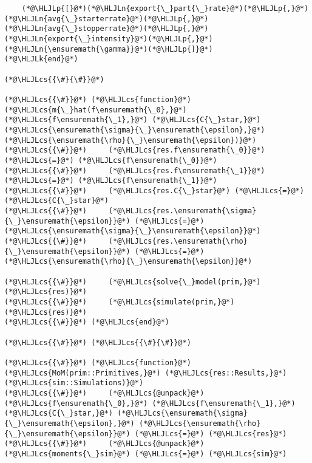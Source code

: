 \documentclass[12pt,a4paper]{article}
\newcommand{\HLJLk}[1]{\textcolor[RGB]{148,91,176}{\textbf{#1}}}
\newcommand{\HLJLn}[1]{#1}
\newcommand{\HLJLp}[1]{#1}
\newcommand{\HLJLcs}[1]{\textcolor[RGB]{153,153,119}{\textit{#1}}}
\begin{document}
\begin{lstlisting}
    (*@\HLJLp{[}@*)(*@\HLJLn{export{\_}part{\_}rate}@*)(*@\HLJLp{,}@*) (*@\HLJLn{avg{\_}starterrate}@*)(*@\HLJLp{,}@*) (*@\HLJLn{avg{\_}stopperrate}@*)(*@\HLJLp{,}@*) (*@\HLJLn{export{\_}intensity}@*)(*@\HLJLp{,}@*) (*@\HLJLn{\ensuremath{\gamma}}@*)(*@\HLJLp{]}@*)
(*@\HLJLk{end}@*)

(*@\HLJLcs{{\#}{\#}}@*)

(*@\HLJLcs{{\#}}@*) (*@\HLJLcs{function}@*) (*@\HLJLcs{m{\_}hat(f\ensuremath{\_0},}@*) (*@\HLJLcs{f\ensuremath{\_1},}@*) (*@\HLJLcs{C{\_}star,}@*) (*@\HLJLcs{\ensuremath{\sigma}{\_}\ensuremath{\epsilon},}@*) (*@\HLJLcs{\ensuremath{\rho}{\_}\ensuremath{\epsilon})}@*)
(*@\HLJLcs{{\#}}@*)     (*@\HLJLcs{res.f\ensuremath{\_0}}@*) (*@\HLJLcs{=}@*) (*@\HLJLcs{f\ensuremath{\_0}}@*)
(*@\HLJLcs{{\#}}@*)     (*@\HLJLcs{res.f\ensuremath{\_1}}@*) (*@\HLJLcs{=}@*) (*@\HLJLcs{f\ensuremath{\_1}}@*)
(*@\HLJLcs{{\#}}@*)     (*@\HLJLcs{res.C{\_}star}@*) (*@\HLJLcs{=}@*) (*@\HLJLcs{C{\_}star}@*)
(*@\HLJLcs{{\#}}@*)     (*@\HLJLcs{res.\ensuremath{\sigma}{\_}\ensuremath{\epsilon}}@*) (*@\HLJLcs{=}@*) (*@\HLJLcs{\ensuremath{\sigma}{\_}\ensuremath{\epsilon}}@*)
(*@\HLJLcs{{\#}}@*)     (*@\HLJLcs{res.\ensuremath{\rho}{\_}\ensuremath{\epsilon}}@*) (*@\HLJLcs{=}@*) (*@\HLJLcs{\ensuremath{\rho}{\_}\ensuremath{\epsilon}}@*)

(*@\HLJLcs{{\#}}@*)     (*@\HLJLcs{solve{\_}model(prim,}@*) (*@\HLJLcs{res)}@*)
(*@\HLJLcs{{\#}}@*)     (*@\HLJLcs{simulate(prim,}@*) (*@\HLJLcs{res)}@*)
(*@\HLJLcs{{\#}}@*) (*@\HLJLcs{end}@*)

(*@\HLJLcs{{\#}}@*) (*@\HLJLcs{{\#}{\#}}@*)

(*@\HLJLcs{{\#}}@*) (*@\HLJLcs{function}@*) (*@\HLJLcs{MoM(prim::Primitives,}@*) (*@\HLJLcs{res::Results,}@*) (*@\HLJLcs{sim::Simulations)}@*)
(*@\HLJLcs{{\#}}@*)     (*@\HLJLcs{@unpack}@*) (*@\HLJLcs{f\ensuremath{\_0},}@*) (*@\HLJLcs{f\ensuremath{\_1},}@*) (*@\HLJLcs{C{\_}star,}@*) (*@\HLJLcs{\ensuremath{\sigma}{\_}\ensuremath{\epsilon},}@*) (*@\HLJLcs{\ensuremath{\rho}{\_}\ensuremath{\epsilon}}@*) (*@\HLJLcs{=}@*) (*@\HLJLcs{res}@*)
(*@\HLJLcs{{\#}}@*)     (*@\HLJLcs{@unpack}@*) (*@\HLJLcs{moments{\_}sim}@*) (*@\HLJLcs{=}@*) (*@\HLJLcs{sim}@*)


\end{lstlisting}
\end{document}
